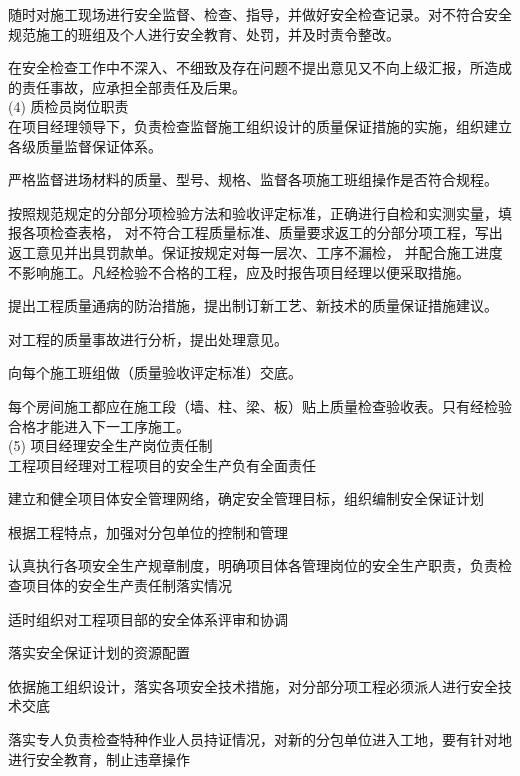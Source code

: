  随时对施工现场进行安全监督、检查、指导，并做好安全检查记录。对不符合安全规范施工的班组及个人进行安全教育、处罚，并及时责令整改。

 在安全检查工作中不深入、不细致及存在问题不提出意见又不向上级汇报，所造成的责任事故，应承担全部责任及后果。\\

(4) 质检员岗位职责\\

 在项目经理领导下，负责检查监督施工组织设计的质量保证措施的实施，组织建立各级质量监督保证体系。

 严格监督进场材料的质量、型号、规格、监督各项施工班组操作是否符合规程。

 按照规范规定的分部分项检验方法和验收评定标准，正确进行自检和实测实量，填报各项检查表格，
对不符合工程质量标准、质量要求返工的分部分项工程，写出返工意见并出具罚款单。保证按规定对每一层次、工序不漏检，
并配合施工进度不影响施工。凡经检验不合格的工程，应及时报告项目经理以便采取措施。

 提出工程质量通病的防治措施，提出制订新工艺、新技术的质量保证措施建议。

 对工程的质量事故进行分析，提出处理意见。

 向每个施工班组做（质量验收评定标准）交底。

 每个房间施工都应在施工段（墙、柱、梁、板）贴上质量检查验收表。只有经检验合格才能进入下一工序施工。 \\

(5) 项目经理安全生产岗位责任制\\

 工程项目经理对工程项目的安全生产负有全面责任

 建立和健全项目体安全管理网络，确定安全管理目标，组织编制安全保证计划

 根据工程特点，加强对分包单位的控制和管理

 认真执行各项安全生产规章制度，明确项目体各管理岗位的安全生产职责，负责检查项目体的安全生产责任制落实情况

 适时组织对工程项目部的安全体系评审和协调

 落实安全保证计划的资源配置

 依据施工组织设计，落实各项安全技术措施，对分部分项工程必须派人进行安全技术交底

 落实专人负责检查特种作业人员持证情况，对新的分包单位进入工地，要有针对地进行安全教育，制止违章操作

